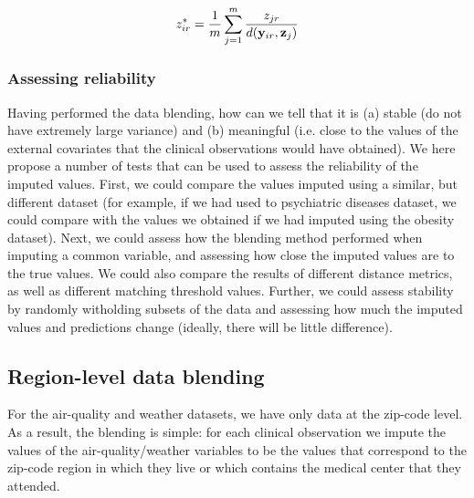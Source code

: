 \documentclass{article}
\begin{document}
$$z^*_{ir} = \frac{1}{m} \sum_{j=1}^m \frac{z_{jr}}{d({\bf y}_{ir}, {\bf z}_{j})}$$

\subsubsection{Assessing reliability}

Having performed the data blending, how can we tell that it is (a) stable (do not have extremely large variance) and (b) meaningful (i.e. close to the values of the external covariates that the clinical observations would have obtained). We here propose a number of tests that can be used to assess the reliability of the imputed values. First, we could compare the values imputed using a similar, but different dataset (for example, if we had used to psychiatric diseases dataset, we could compare with the values we obtained if we had imputed using the obesity dataset). Next, we could assess how the blending method performed when imputing a common variable, and assessing how close the imputed values are to the true values. We could also compare the results of different distance metrics, as well as different matching threshold values. Further, we could assess stability by randomly witholding subsets of the data and assessing how much the imputed values and predictions change (ideally, there will be little difference).


\subsection{Region-level data blending}


For the air-quality and weather datasets, we have only data at the zip-code level. As a result, the blending is simple: for each clinical observation we impute the values of the air-quality/weather variables to be the values that correspond to the zip-code region in which they live or which contains the medical center that they attended.
\end{document}
